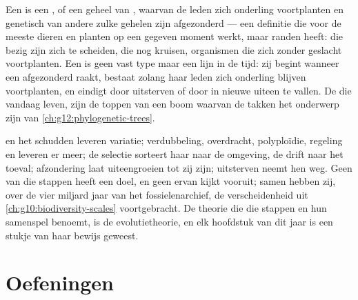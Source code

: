 \begin{proposition}\label{prop:g12:selection-drift-speciation:concept}
Een  is een , of een geheel van , waarvan de leden
zich onderling voortplanten en genetisch van andere zulke gehelen zijn
afgezonderd --- een definitie die voor de meeste dieren en planten op een
gegeven moment werkt, maar randen heeft:  die bezig zijn zich te
scheiden,  die nog kruisen, organismen die zich zonder geslacht
voortplanten. Een  is geen vast type maar een lijn in de tijd: zij
begint wanneer een  afgezonderd raakt, bestaat zolang haar leden
zich onderling blijven voortplanten, en eindigt door uitsterven of door in
nieuwe  uiteen te vallen. De  die vandaag leven, zijn de
toppen van een boom waarvan de takken het onderwerp zijn van
\cref{ch:g12:phylogenetic-trees}.
\end{proposition}
\admitted

\begin{remark}\label{rem:g12:selection-drift-speciation:assembled}
 en het schudden leveren variatie; verdubbeling, overdracht,
polyploïdie, regeling en  leveren er meer; de selectie sorteert
haar naar de omgeving, de drift naar het toeval; afzondering laat
 uiteengroeien tot zij  zijn; uitsterven neemt hen weg.
Geen van die stappen heeft een doel, en geen ervan kijkt vooruit; samen
hebben zij, over de vier miljard jaar van het fossielenarchief, de
verscheidenheid uit \cref{ch:g10:biodiversity-scales} voortgebracht. De
theorie die die stappen en hun samenspel benoemt, is de evolutietheorie,
en elk hoofdstuk van dit jaar is een stukje van haar bewijs geweest.
\end{remark}

\section{Oefeningen}

